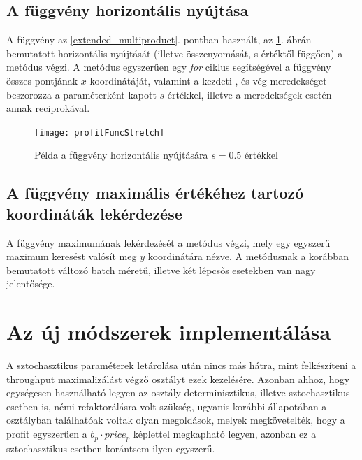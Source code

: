 \subsection{A függvény horizontális nyújtása} \label{stretch}
A függvény az \ref{extended_multiproduct}. pontban használt, az \ref{profit_func_stretch}. ábrán bemutatott horizontális nyújtását (illetve összenyomását, s értéktől függően) a  metódus végzi.
A metódus egyszerűen egy \textit{for} ciklus segítségével a függvény összes pontjának $x$ koordinátáját, valamint a kezdeti-, és vég meredekséget beszorozza a paraméterként kapott $s$ értékkel, illetve a meredekségek esetén annak reciprokával. 
\begin{figure}[H]
\begin{center}
\texttt{[image: profitFuncStretch]}
\caption{Példa a függvény horizontális nyújtására $s=0.5$ értékkel}
\label{profit_func_stretch}
\end{center}
\end{figure}
\subsection{A függvény maximális értékéhez tartozó koordináták lekérdezése}
A függvény maximumának lekérdezését a  metódus végzi, mely egy egyszerű maximum keresést valósít meg $y$ koordinátára nézve.
A metódusnak a korábban bemutatott változó batch méretű, illetve két lépcsős esetekben van nagy jelentősége.

\section{Az új módszerek implementálása} \label{refactor}
A sztochasztikus paraméterek letárolása után nincs más hátra, mint felkészíteni a throughput maximalizálást végző  osztályt ezek kezelésére.
Azonban ahhoz, hogy egységesen használható legyen az osztály determinisztikus, illetve sztochasztikus esetben is, némi refaktorálásra volt szükség, ugyanis korábbi állapotában a  osztályban találhatóak voltak olyan megoldások, melyek megkövetelték, hogy a profit egyszerűen a $b_p\cdot price_p$ képlettel megkapható legyen, azonban ez a sztochasztikus esetben korántsem ilyen egyszerű.
